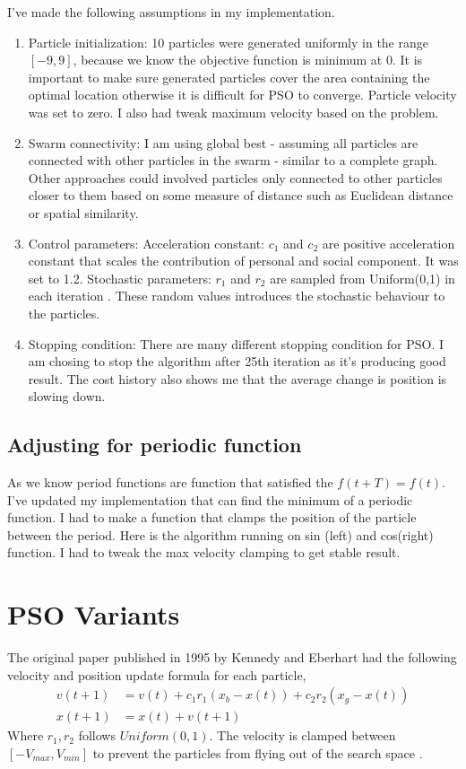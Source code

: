\documentclass{article}
\begin{document}
I've made the following assumptions in my implementation.
\begin{enumerate}
  \item Particle initialization: 10 particles were generated uniformly in the range $[-9, 9]$, because we know the objective function is minimum at 0. It is important to make sure generated particles cover the area containing the optimal location otherwise it is difficult for PSO to converge. Particle velocity was set to zero. I also had tweak maximum velocity based on the problem.
  \item Swarm connectivity: I am using global best - assuming all particles are connected with other particles in the swarm - similar to a complete graph. Other approaches could involved particles only connected to other particles closer to them based on some measure of distance such as Euclidean distance or spatial similarity.
  \item Control parameters: 
  \subitem Acceleration constant: $c_1$ and $c_2$ are positive acceleration constant that scales the contribution of personal and social component. It was  set to 1.2.
  \subitem Stochastic parameters: $r_1$ and $r_2$ are sampled from Uniform(0,1) in each iteration \cite{engelbrecht2007computational}. These random values introduces the stochastic behaviour to the particles.
  \item Stopping condition: There are many different stopping condition for PSO. I am chosing to stop the algorithm after 25th iteration as it's producing good result. The cost history also shows me that the average change is position is slowing down.
\end{enumerate}

\subsection{Adjusting for periodic function}
As we know period functions are function that satisfied the $f(t + T) = f(t)$. I've updated my implementation that can find the minimum of a  periodic function. I had to make a function that clamps the position of the particle between the period. Here is the algorithm running on sin (left) and cos(right) function. I had to tweak the max velocity clamping to get stable result.


\section{PSO Variants}
The original paper published in 1995 by Kennedy and Eberhart had the following velocity and position update formula for each particle, 
\begin{align*}
v(t+1) &= v(t) + c_1r_1(x_b - x(t)) + c_2r_2(x_g - x(t)) \\
x(t+1) &= x(t) + v(t+1) 
\end{align*}
Where $r_1, r_2$ follows $Uniform(0,1)$. The velocity is clamped between $[-V_{max}, V_{min}]$ to prevent the particles from flying out of the search space \cite{kennedy1995particle}.
\end{document}
